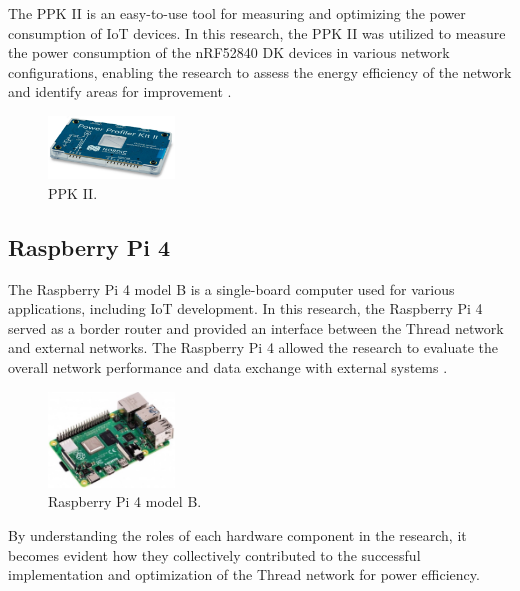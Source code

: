 The \acrfull{PPK} II is an easy-to-use tool for measuring and optimizing the power consumption of \gls{IoT} devices. In this research, the \gls{PPK} II was utilized to measure the power consumption of the \gls{nRF}52840 \gls{DK} devices in various network configurations, enabling the research to assess the energy efficiency of the network and identify areas for improvement \cite{Semiconductor_Nordic_PPK_II_2018_1.0}.

\begin{figure}[H]
    \centering
    \includegraphics[width=0.3\textwidth]{images/situational_theoretical_analysis/nRF_Power_Profiler_Kit_II.png}
    \caption{\gls{PPK} II.}
    \label{fig:nRF_Power_Profiler_Kit_II}
\end{figure}

\subsection{Raspberry Pi 4}

The Raspberry Pi 4 model B is a single-board computer used for various applications, including \gls{IoT} development. In this research, the Raspberry Pi 4 served as a border router and provided an interface between the Thread network and external networks. The Raspberry Pi 4 allowed the research to evaluate the overall network performance and data exchange with external systems \cite{alm2019internet}.

\begin{figure}[H]
    \centering
    \includegraphics[width=0.3\textwidth]{images/situational_theoretical_analysis/Raspberry_Pi_4.jpg}
    \caption{Raspberry Pi 4 model B.}
    \label{fig:Raspberry_Pi_4}
\end{figure}

By understanding the roles of each hardware component in the research, it becomes evident how they collectively contributed to the successful implementation and optimization of the Thread network for power efficiency.

